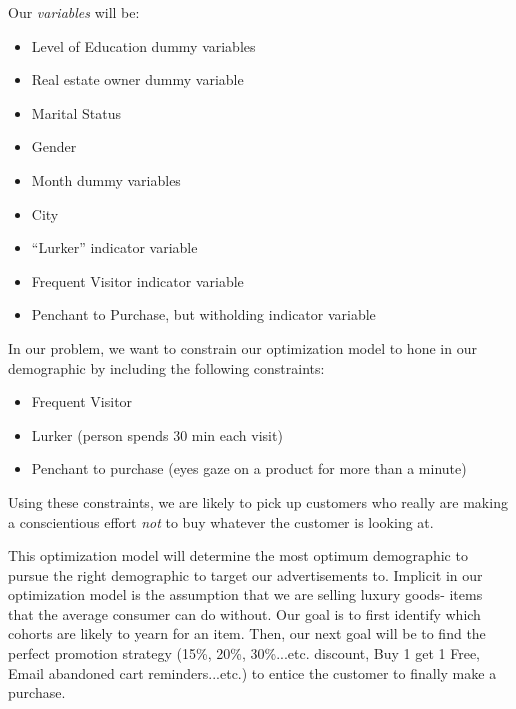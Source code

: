 \documentclass[letterpaper,12pt]{article}
\begin{document}
Our \emph{variables} will be:

\begin{itemize}
\item Level of Education dummy variables
\item Real estate owner dummy variable
\item Marital Status
\item Gender
\item Month dummy variables
\item City
\item ``Lurker'' indicator variable
\item Frequent Visitor indicator variable
  \item Penchant to Purchase, but witholding indicator variable
\end{itemize}

In our problem, we want to constrain our optimization model to hone in our demographic by including the following constraints:

\begin{itemize}
\item Frequent Visitor
\item Lurker (person spends 30 min each visit)
\item Penchant to purchase (eyes gaze on a product for more than a minute)
\end{itemize}

Using these constraints, we are likely to pick up customers who really are making a conscientious effort \emph{not} to buy whatever the customer is looking at.  
    

This optimization model will determine the most optimum demographic to pursue the right demographic to target our advertisements to.  Implicit in our optimization model is the assumption that we are selling luxury goods- items that the average consumer can do without.  Our goal is to first identify which cohorts are likely to yearn for an item.  Then, our next goal will be to find the perfect promotion strategy (15\%, 20\%, 30\%...etc. discount, Buy 1 get 1 Free, Email abandoned cart reminders...etc.) to entice the customer to finally make a purchase. 
       
\end{document}
